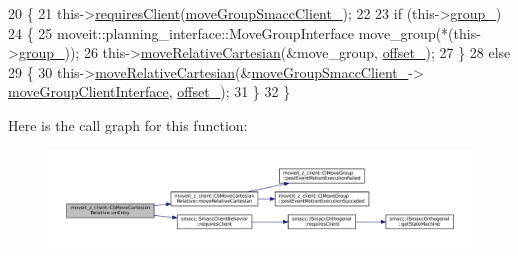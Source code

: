 \begin{DoxyCode}
20 \{
21   this->\hyperlink{classsmacc_1_1SmaccClientBehavior_a917f001e763a1059af337bf4e164f542}{requiresClient}(\hyperlink{classmoveit__z__client_1_1CbMoveCartesianRelative_abe1a99706adf6cb61aacb034e0b6a4c9}{moveGroupSmaccClient\_});
22 
23   \textcolor{keywordflow}{if} (this->\hyperlink{classmoveit__z__client_1_1CbMoveCartesianRelative_a45ff6b4ef0f48f75101f97fe1b5ff58d}{group\_})
24   \{
25     moveit::planning\_interface::MoveGroupInterface move\_group(*(this->\hyperlink{classmoveit__z__client_1_1CbMoveCartesianRelative_a45ff6b4ef0f48f75101f97fe1b5ff58d}{group\_}));
26     this->\hyperlink{classmoveit__z__client_1_1CbMoveCartesianRelative_aa8535a52826c36b103abebba6da7737f}{moveRelativeCartesian}(&move\_group, \hyperlink{classmoveit__z__client_1_1CbMoveCartesianRelative_aa5316f2f734336722a353a8e9addea95}{offset\_});
27   \}
28   \textcolor{keywordflow}{else}
29   \{
30     this->\hyperlink{classmoveit__z__client_1_1CbMoveCartesianRelative_aa8535a52826c36b103abebba6da7737f}{moveRelativeCartesian}(&\hyperlink{classmoveit__z__client_1_1CbMoveCartesianRelative_abe1a99706adf6cb61aacb034e0b6a4c9}{moveGroupSmaccClient\_}->
      \hyperlink{classmoveit__z__client_1_1ClMoveGroup_af86e046b837be0ef4afa9893d8808f20}{moveGroupClientInterface}, \hyperlink{classmoveit__z__client_1_1CbMoveCartesianRelative_aa5316f2f734336722a353a8e9addea95}{offset\_});
31   \}
32 \}
\end{DoxyCode}
Here is the call graph for this function\+:
\nopagebreak
\begin{figure}[H]
\begin{center}
\leavevmode
\includegraphics[width=350pt]{classmoveit__z__client_1_1CbMoveCartesianRelative_aaea0e6c7431f93301a77269b8fa539f8_cgraph}
\end{center}
\end{figure}
\mbox{\label{classmoveit__z__client_1_1CbMoveCartesianRelative_a539af37d16cffdc51127c7a5206504cb}} 
